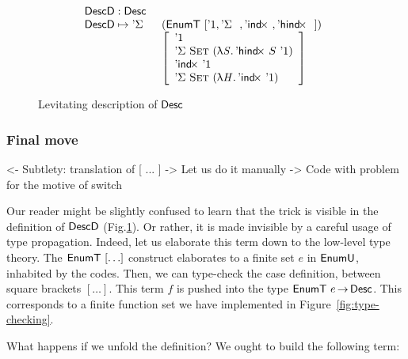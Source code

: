 \begin{figure}

\[\stk{
\DescD : \Desc \\
\begin{array}{@{}ll}
\DescD \mapsto \DSigma{}{} & (\EnumT [ \DUnit, \DSigma{}{}, \DIndx{}, \DHindx{}{} ]) \\
                           & \left[\begin{array}{l}
                                   \DUnit                                            \\
                                   \DSigma{\Set}{(\LAM{\V{S}} \DHindx{S}{\DUnit})}   \\
                                   \DIndx{\DUnit}                                    \\
                                   \DSigma{\Set}{(\LAM{\V{H}} \DIndx{\DUnit})}
                                   \end{array}
                             \right]
\end{array}
}\]

\caption{Levitating description of $\Desc$}
\label{fig:desc-levitate}

\end{figure}

\subsubsection{Final move}

\begin{wstructure}
<- Subtlety: translation of [ ... ]
    -> Let us do it manually
        -> Code with problem for the motive of switch
\end{wstructure}

Our reader might be slightly confused to learn that the trick is
visible in the definition of $\DescD$
(Fig.\ref{fig:desc-levitate}). Or rather, it is made invisible by a
careful usage of type propagation. Indeed, let us elaborate this term
down to the low-level type theory. The $\EnumT [ \ldots ]$ construct
elaborates to a finite set $e$ in $\EnumU$, inhabited by the
codes. Then, we can type-check the case definition, between square
brackets $[ \ldots ]$. This term $f$ is pushed into the type
$\EnumT{e} \To \Desc$. This corresponds to a finite function set we
have implemented in Figure~\ref{fig:type-checking}.

What happens if we unfold the definition? We ought to build the following term:

